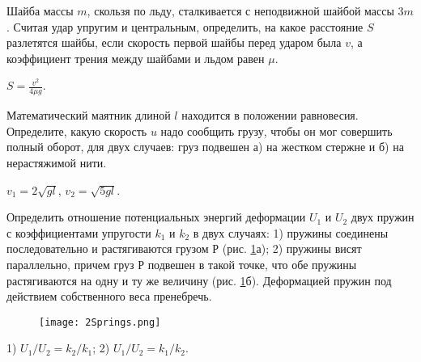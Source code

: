 \begin{ex} %
Шайба массы $m$, скользя по льду, сталкивается с неподвижной шайбой массы $3m$. Считая удар упругим и центральным, определить, на какое расстояние $S$ разлетятся шайбы, если скорость первой шайбы перед ударом была $v$, а коэффициент трения между шайбами и льдом равен $\mu$.
\begin{ans}
$S = \frac{v^2}{4 \mu g}$.
\end{ans}
\end{ex}

\begin{ex} %
Математический маятник длиной $l$ находится в положении равновесия. Определите, какую скорость $u$ надо сообщить грузу, чтобы он мог совершить полный оборот, для двух случаев: груз подвешен а) на жестком стержне и б) на нерастяжимой нити.
\begin{ans}
$v_1 = 2\sqrt{gl}$, $v_2 = \sqrt{5gl}$.
\end{ans}
\end{ex}

\begin{ex} %
Определить отношение потенциальных энергий деформации $U_1$ и $U_2$ двух пружин с коэффициентами упругости $k_1$ и $k_2$ в двух случаях: 1) пружины соединены последовательно и растягиваются грузом $Р$ (рис. \ref{2Springs}а); 2) пружины висят параллельно, причем груз $Р$ подвешен в такой точке, что обе пружины растягиваются на одну и ту же величину (рис. \ref{2Springs}б). Деформацией пружин под действием собственного веса пренебречь.

\begin{figure}[h]
\centering
\texttt{[image: 2Springs.png]}
\caption{}
\label{2Springs}
\end{figure}

\begin{ans}
1) $U_1/U_2 = k_2/k_1$; 2) $U_1/U_2 = k_1/k_2$.
\end{ans}
\end{ex}

\complexProblems

